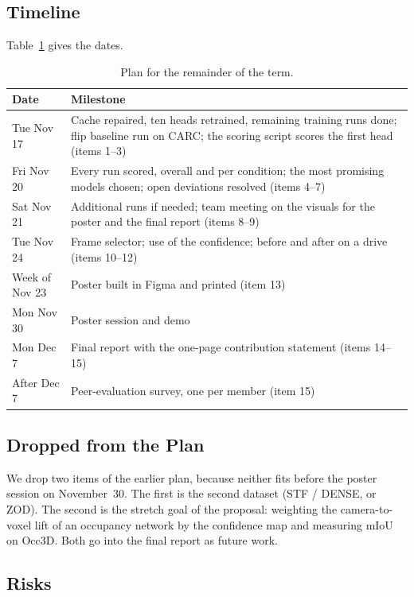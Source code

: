 \subsection{Timeline}

Table~\ref{tab:timeline} gives the dates.

\begin{table}[!ht]
  \centering
  \small
  \setlength{\tabcolsep}{4pt}
  \begin{tabular}{@{}l p{5.2cm}@{}}
    \toprule
    \textbf{Date} & \textbf{Milestone} \\
    \midrule
    Tue Nov 17 & Cache repaired, ten heads retrained, remaining training runs done; flip baseline run on CARC; the scoring script scores the first head (items 1--3) \\
    Fri Nov 20 & Every run scored, overall and per condition; the most promising models chosen; open deviations resolved (items 4--7) \\
    Sat Nov 21 & Additional runs if needed; team meeting on the visuals for the poster and the final report (items 8--9) \\
    Tue Nov 24 & Frame selector; use of the confidence; before and after on a drive (items 10--12) \\
    Week of Nov 23 & Poster built in Figma and printed (item 13) \\
    Mon Nov 30 & Poster session and demo \\
    Mon Dec 7 & Final report with the one-page contribution statement (items 14--15) \\
    After Dec 7 & Peer-evaluation survey, one per member (item 15) \\
    \bottomrule
  \end{tabular}
  \caption{Plan for the remainder of the term.}
  \label{tab:timeline}
\end{table}

\subsection{Dropped from the Plan}

We drop two items of the earlier plan, because neither fits before the poster session on November~30. The first is the second dataset (STF / DENSE, or ZOD). The second is the stretch goal of the proposal: weighting the camera-to-voxel lift of an occupancy network by the confidence map and measuring mIoU on Occ3D. Both go into the final report as future work.

\subsection{Risks}

